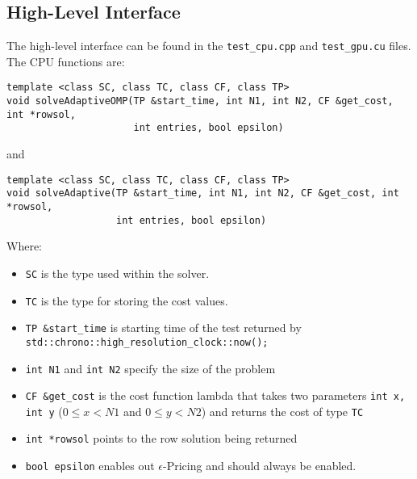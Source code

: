 \documentclass[format=acmsmall,review=false, screen=true]{acmart}
\begin{document}
\subsection{High-Level Interface}
The high-level interface can be found in the \texttt{test\_cpu.cpp} and \texttt{test\_gpu.cu} files. The CPU functions are:
\begin{verbatim}
template <class SC, class TC, class CF, class TP>
void solveAdaptiveOMP(TP &start_time, int N1, int N2, CF &get_cost, int *rowsol, 
                      int entries, bool epsilon)
\end{verbatim}
and
\begin{verbatim}
template <class SC, class TC, class CF, class TP>
void solveAdaptive(TP &start_time, int N1, int N2, CF &get_cost, int *rowsol, 
                   int entries, bool epsilon)
\end{verbatim}
Where:
\begin{itemize}\raggedright
\item \texttt{SC} is the type used within the solver.
\item \texttt{TC} is the type for storing the cost values.
\item \texttt{TP \&start\_time} is starting time of the test returned by  \texttt{std::chrono::high\_resolution\_clock::now();}
\item \texttt{int N1} and \texttt{int N2} specify the size of the problem
\item \texttt{CF \&get\_cost} is the cost function lambda that takes two parameters \texttt{int x, int y} ($0 \leq x < N1$ and $0 \leq y < N2$) and returns the cost of type \texttt{TC}
\item \texttt{int *rowsol} points to the row solution being returned
\item \texttt{bool epsilon} enables out $\epsilon$-Pricing and should always be enabled.
\end{itemize}
\end{document}
